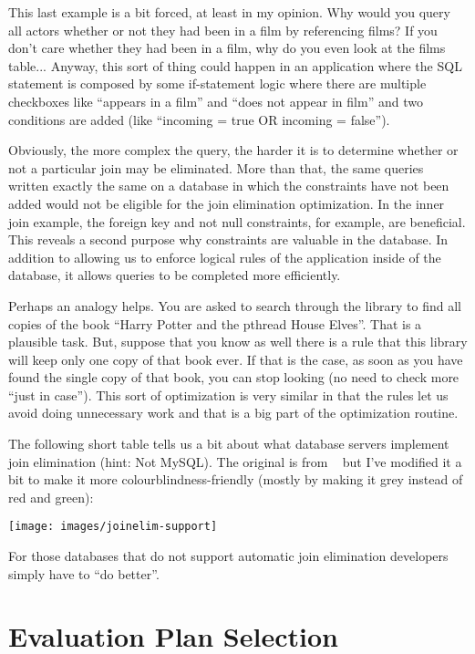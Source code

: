 This last example is a bit forced, at least in my opinion. Why would you query all actors whether or not they had been in a film by referencing films? If you don't care whether they had been in a film, why do you even look at the films table... Anyway, this sort of thing could happen in an application where the SQL statement is composed by some if-statement logic where there are multiple checkboxes like ``appears in a film'' and ``does not appear in film'' and two conditions are added (like ``incoming = true OR incoming = false'').

Obviously, the more complex the query, the harder it is to determine whether or not a particular join may be eliminated. More than that, the same queries written exactly the same on a database in which the constraints have not been added would not be eligible for the join elimination optimization. In the inner join example, the foreign key and not null constraints, for example, are beneficial. This reveals a second purpose why constraints are valuable in the database. In addition to allowing us to enforce logical rules of the application inside of the database, it allows queries to be completed more efficiently.

Perhaps an analogy helps. You are asked to search through the library to find all copies of the book ``Harry Potter and the pthread House Elves''. That is a plausible task. But, suppose that you know as well there is a rule that this library will keep only one copy of that book ever. If that is the case, as soon as you have found the single copy of that book, you can stop looking (no need to check more ``just in case''). This sort of optimization is very similar in that the rules let us avoid doing unnecessary work and that is a big part of the optimization routine.

The following short table tells us a bit about what database servers implement join elimination (hint: Not MySQL). The original is from ~\cite{joinelim} but I've modified it a bit to make it more colourblindness-friendly (mostly by making it grey instead of red and green):

\begin{center}
	\texttt{[image: images/joinelim-support]}
\end{center}

For those databases that do not support automatic join elimination developers simply have to ``do better''. 

\section*{Evaluation Plan Selection}

